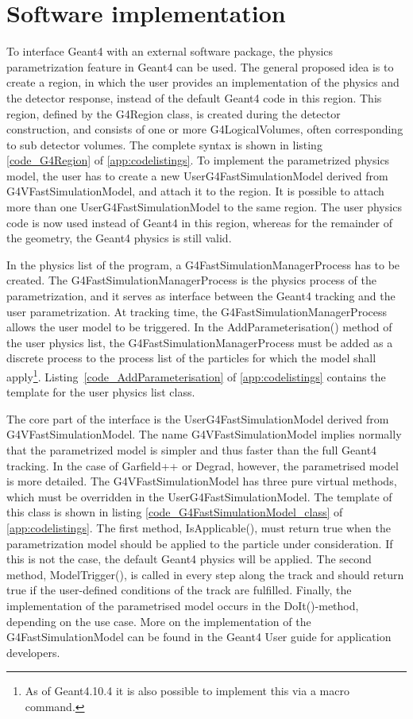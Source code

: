 \documentclass[preprint,12pt,sort&compress]{elsarticle}
\begin{document}
\section{Software implementation}

To interface Geant4 with an external software package, the physics para\-metrization feature in Geant4 can be used. The general proposed idea is to create a region, in which the user provides an implementation of the physics and the detector response, instead of the default Geant4 code in this region. This region, defined by the G4Region class, is created during the detector construction, and consists of one or more G4LogicalVolumes, often corresponding to sub detector volumes. The complete syntax is shown in listing \ref{code_G4Region} of \ref{app:codelistings}. To implement the parametrized physics model, the user has to create a new UserG4Fast\-Simulation\-Model derived from G4VFast\-Simulation\-Model, and attach it to the region. It is possible to attach more than one UserG4Fast\-Simulation\-Model to the same region. The user physics code is now used instead of Geant4 in this region, whereas for the remainder of the geometry, the Geant4 physics is still valid.

In the physics list of the program, a G4Fast\-Simulation\-Manager\-Process has to be created. The G4Fast\-Simulation\-Manager\-Process is the physics process of the parametrization, and it serves as interface between the Geant4 tracking and the user parametrization. At tracking time, the G4Fast\-Simulation\-Manager\-Process allows the user model to be triggered. In the AddParameterisation() method of the user physics list, the G4Fast\-Simulation\-Manager\-Process must be added as a discrete process to the process list of the particles for which the model shall apply\footnote{As of Geant4.10.4 it is also possible to implement this via a macro command.}. Listing~\ref{code_AddParameterisation} of \ref{app:codelistings} contains the template for the user physics list class.

The core part of the interface is the User\-G4Fast\-Simulation\-Model derived from G4VFast\-Simulation\-Model. The name G4VFast\-Simulation\-Model implies normally that the parametrized model is simpler and thus faster than the full Geant4 tracking. In the case of Garfield++ or Degrad, however, the parametrised model is more detailed. The G4VFast\-Simulation\-Model has three pure virtual methods, which must be overridden in the User\-G4Fast\-Simulation\-Model. The template of this class is shown in listing \ref{code_G4FastSimulationModel_class} of \ref{app:codelistings}. The first method, IsApplicable(), must return true when the parametrization model should be applied to the particle under consideration. If this is not the case, the default Geant4 physics will be applied. The second method, ModelTrigger(), is called in every step along the track and should return true if the user-defined conditions of the track are fulfilled. Finally, the implementation of the parametrised model occurs in the DoIt()-method, depending on the use case.  More on the implementation of the G4Fast\-Simulation\-Model can be found in the Geant4 User guide for application developers\cite{Geant4UserGuide}.
\end{document}
